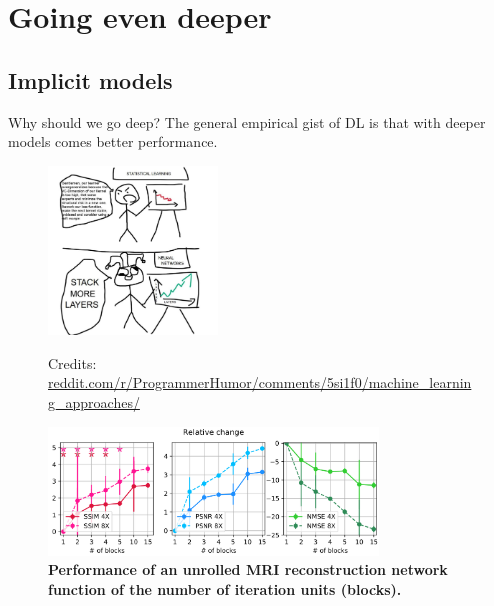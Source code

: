 \section{Going even deeper}
\subsection{Implicit models}

\begin{frame}{Why should we go deep?}
    The general empirical gist of DL is that with deeper models comes better performance.
    \begin{figure}
        \begin{overprint}
            \centering\includegraphics[width=0.4\textwidth]{Figures/shine_figures/more_layers.jpg}\caption{Credits: \href{reddit.com/r/ProgrammerHumor/comments/5si1f0/machine_learning_approaches/}{reddit.com/r/ProgrammerHumor/comments/5si1f0/machine\_learning\_approaches/}}
            \centering\includegraphics[width=0.78\textwidth]{Figures/shine_figures/pezzotti.png}\caption{\textbf{Performance of an unrolled MRI reconstruction network function of the number of iteration units (blocks).}}
        \end{overprint}
    \end{figure}
\end{frame}

